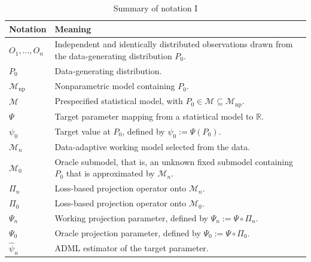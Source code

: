 \documentclass[11pt]{article}
\theoremstyle{definition}
\begin{document}
\begin{table}[H]
\centering
\caption{Summary of notation I}
\label{tab:notation1}
\begin{tabular}{p{}p{}}
\toprule
Notation & Meaning \\
\midrule
\(O_1, \ldots, O_n\) & Independent and identically distributed observations drawn from the data-generating distribution \(P_0\). \\

\(P_0\) & Data-generating distribution. \\

\(\mathcal{M}_{\mathrm{np}}\) & Nonparametric model containing \(P_0\). \\

\(\mathcal{M}\) & Prespecified statistical model, with \(P_0 \in \mathcal{M} \subseteq \mathcal{M}_{\mathrm{np}}\). \\

\(\Psi\) & Target parameter mapping from a statistical model to \(\mathbb{R}\). \\

\(\psi_0\) & Target value at \(P_0\), defined by \(\psi_0 := \Psi(P_0)\). \\

\(\mathcal{M}_n\) & Data-adaptive working model selected from the data. \\

\(\mathcal{M}_0\) & Oracle submodel, that is, an unknown fixed submodel containing \(P_0\) that is approximated by \(\mathcal{M}_n\). \\

\(\Pi_n\) & Loss-based projection operator onto \(\mathcal{M}_n\). \\

\(\Pi_0\) & Loss-based projection operator onto \(\mathcal{M}_0\). \\

\(\Psi_n\) & Working projection parameter, defined by \(\Psi_n := \Psi \circ \Pi_n\). \\

\(\Psi_0\) & Oracle projection parameter, defined by \(\Psi_0 := \Psi \circ \Pi_0\). \\

\(\widehat{\psi}_n\) & ADML estimator of the target parameter. \\
\bottomrule
\end{tabular}
\end{table}
\end{document}
